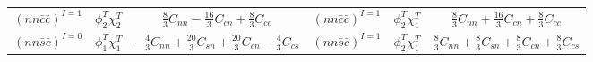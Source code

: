 \documentclass[12pt,onecolumn,floatfix,nofootinbib]{revtex4}
\begin{document}
\begin{table}[!htb]
\begin{tabular}{cccccc}
${\left(nn\bar{c}\bar{c}\right)}^{I=1}$ & $\phi_{2}^{T}\chi_{2}^{T}$ & $%
\frac{8}{3}C_{nn}-\frac{16}{3}C_{cn}+\frac{8}{3}C_{cc}$ & ${\left(nn\bar{c}%
\bar{c}\right)}^{I=1}$ & $\phi_{2}^{T}\chi_{1}^{T}$ & $\frac{8}{3}C_{nn}+%
\frac{16}{3}C_{cn}+\frac{8}{3}C_{cc}$ \\
${\left(nn\bar{s}\bar{c}\right)}^{I=0}$ & $\phi_{1}^{T}\chi_{1}^{T}$ & $-%
\frac{4}{3}C_{nn}+\frac{20}{3}C_{sn}+\frac{20}{3}C_{cn}-\frac{4}{3}C_{cs}$ &
${\left(nn\bar{s}\bar{c}\right)}^{I=1}$ & $\phi_{2}^{T}\chi_{1}^{T}$ & $%
\frac{8}{3}C_{nn}+\frac{8}{3}C_{sn}+\frac{8}{3}C_{cn}+\frac{8}{3}C_{cs}$ \\
\hline\hline
\end{tabular}%
\end{table}

\renewcommand{\tabcolsep}{0.27cm} \renewcommand{\arraystretch}{1.5}
\end{document}
